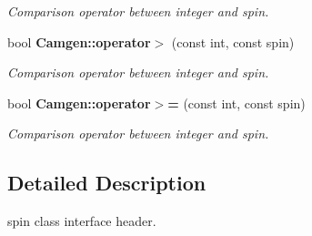 \begin{DoxyCompactItemize}
\begin{DoxyCompactList}\small\item\em Comparison operator between integer and spin. \end{DoxyCompactList}\item 
\hypertarget{a00878_a1785655e592a67a21af31d0d8d58d635}{}bool {\bfseries Camgen\+::operator$>$} (const int, const spin)\label{a00878_a1785655e592a67a21af31d0d8d58d635}

\begin{DoxyCompactList}\small\item\em Comparison operator between integer and spin. \end{DoxyCompactList}\item 
\hypertarget{a00878_ad1b6d03e18af7cc21fe03a5083320d4a}{}bool {\bfseries Camgen\+::operator$>$=} (const int, const spin)\label{a00878_ad1b6d03e18af7cc21fe03a5083320d4a}

\begin{DoxyCompactList}\small\item\em Comparison operator between integer and spin. \end{DoxyCompactList}\end{DoxyCompactItemize}


\subsection{Detailed Description}
spin class interface header. 

